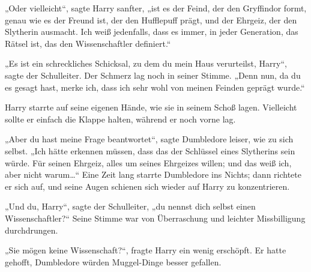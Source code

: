 „Oder vielleicht“, sagte Harry sanfter, „ist es der Feind, der den Gryffindor formt, genau wie es der Freund ist, der den Hufflepuff prägt, und der Ehrgeiz, der den Slytherin ausmacht. Ich weiß jedenfalls, dass es immer, in jeder Generation, das Rätsel ist, das den Wissenschaftler definiert.“

„Es ist ein schreckliches Schicksal, zu dem du mein Haus verurteilst, Harry“, sagte der Schulleiter. Der Schmerz lag noch in seiner Stimme. „Denn nun, da du es gesagt hast, merke ich, dass ich sehr wohl von meinen Feinden geprägt wurde.“

Harry starrte auf seine eigenen Hände, wie sie in seinem Schoß lagen. Vielleicht sollte er einfach die Klappe halten, während er noch vorne lag.

„Aber du hast meine Frage beantwortet“, sagte Dumbledore leiser, wie zu sich selbst. „Ich hätte erkennen müssen, dass das der Schlüssel eines Slytherins sein würde. Für seinen Ehrgeiz, alles um seines Ehrgeizes willen; und das weiß ich, aber nicht warum…“ Eine Zeit lang starrte Dumbledore ins Nichts; dann richtete er sich auf, und seine Augen schienen sich wieder auf Harry zu konzentrieren.

„Und du, Harry“, sagte der Schulleiter, „du nennst dich selbst einen Wissenschaftler?“ Seine Stimme war von Überraschung und leichter Missbilligung durchdrungen.

„Sie mögen keine Wissenschaft?“, fragte Harry ein wenig erschöpft. Er hatte gehofft, Dumbledore würden Muggel-Dinge besser gefallen.

